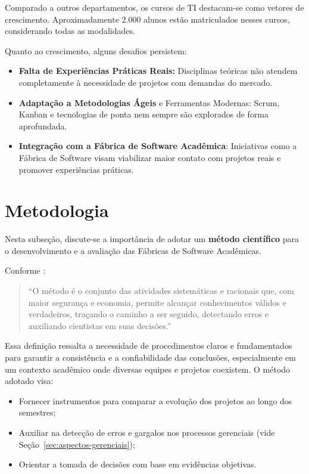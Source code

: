 \documentclass[
	12pt,           %
	openright,      %
	oneside,        %
	a4paper,        %
	brazil          %
]{abntex2}
\begin{document}
Comparado a outros departamentos, os cursos de TI destacam-se como vetores de crescimento. Aproximadamente 2.000 alunos estão matriculados nesses cursos, considerando todas as modalidades.

Quanto ao crescimento, alguns desafios persistem:
\begin{itemize}
  \item \textbf{Falta de Experiências Práticas Reais:} Disciplinas teóricas não atendem completamente à necessidade de projetos com demandas do mercado.
  \item \textbf{Adaptação a Metodologias Ágeis} e Ferramentas Modernas: Scrum, Kanban e tecnologias de ponta nem sempre são explorados de forma aprofundada.
  \item \textbf{Integração com a Fábrica de Software Acadêmica}: Iniciativas como a Fábrica de Software visam viabilizar maior contato com projetos reais e promover experiências práticas.
\end{itemize}

\section{Metodologia}
\label{sec:metodologia-fundteorica}

Nesta subseção, discute-se a importância de adotar um \textbf{método científico} para o desenvolvimento e a avaliação das Fábricas de Software Acadêmicas.

Conforme :
\begin{quote}
    ``O m\'etodo \'e o conjunto das atividades sistem\'aticas e racionais que, com maior seguran\c{c}a e economia, permite alcan\c{c}ar conhecimentos v\'alidos e verdadeiros, tra\c{c}ando o caminho a ser seguido, detectando erros e auxiliando cientistas em suas decis\~oes.''
\end{quote}

Essa definição ressalta a necessidade de procedimentos claros e fundamentados para garantir a consistência e a confiabilidade das conclusões, especialmente em um contexto acadêmico onde diversas equipes e projetos coexistem. O método adotado visa:
\begin{itemize}
    \item Fornecer instrumentos para comparar a evolução dos projetos ao longo dos semestres;
    \item Auxiliar na detecção de erros e gargalos nos processos gerenciais (vide Seção~\ref{sec:aspectos-gerenciais});
    \item Orientar a tomada de decisões com base em evidências objetivas.
\end{itemize}
\end{document}
